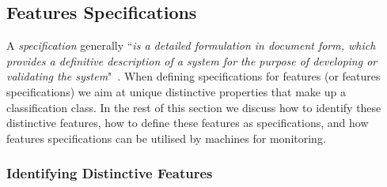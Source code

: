 % 
% 


\subsection{Features Specifications}



A \textit{specification} generally ``\textit{is a detailed formulation in document form, which provides a definitive description of a system for the purpose of developing or validating the system}"~\cite{ISO24765}\cite{Dhaminda2022a}. 
%
When defining specifications for features (or features specifications) we aim at unique distinctive properties that make up a classification class. In the rest of this section we discuss how to identify these distinctive features, how to define these features as specifications, and how features specifications can be utilised by machines for monitoring.  

\subsubsection{Identifying Distinctive Features}
 
